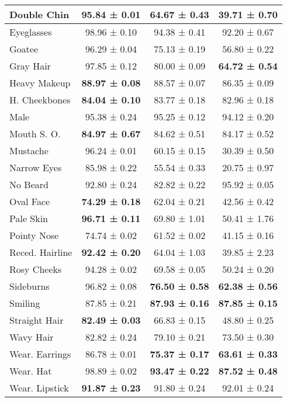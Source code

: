 \begin{table*}[h]
\begin{center}
\begin{small}
{\begin{tabular}{|l|c|c|c|}
Double Chin     & \textbf{95.84 ± 0.01} & 64.67 ± 0.43 & 39.71 ± 0.70 \\ \hline
Eyeglasses      & 98.96 ± 0.10 & 94.38 ± 0.41 & 92.20 ± 0.67 \\ \hline
Goatee          & 96.29 ± 0.04 & 75.13 ± 0.19 & 56.80 ± 0.22 \\ \hline
Gray Hair       & 97.85 ± 0.12 & 80.00 ± 0.09 & \textbf{64.72 ± 0.54} \\ \hline
Heavy Makeup    & \textbf{88.97 ± 0.08} & 88.57 ± 0.07 & 86.35 ± 0.09 \\ \hline
H. Cheekbones   & \textbf{84.04 ± 0.10} & 83.77 ± 0.18 & 82.96 ± 0.18 \\ \hline
Male            & 95.38 ± 0.24 & 95.25 ± 0.12 & 94.12 ± 0.20 \\ \hline
Mouth S. O.     & \textbf{84.97 ± 0.67} & 84.62 ± 0.51 & 84.17 ± 0.52 \\ \hline
Mustache        & 96.24 ± 0.01 & 60.15 ± 0.15 & 30.39 ± 0.50 \\ \hline
Narrow Eyes     & 85.98 ± 0.22 & 55.54 ± 0.33 & 20.75 ± 0.97 \\ \hline
No Beard        & 92.80 ± 0.24 & 82.82 ± 0.22 & 95.92 ± 0.05 \\ \hline
Oval Face       & \textbf{74.29 ± 0.18} & 62.04 ± 0.21 & 42.56 ± 0.42 \\ \hline
Pale Skin       & \textbf{96.71 ± 0.11} & 69.80 ± 1.01 & 50.41 ± 1.76 \\ \hline
Pointy Nose     & 74.74 ± 0.02 & 61.52 ± 0.02 & 41.15 ± 0.16 \\ \hline
Reced. Hairline & \textbf{92.42 ± 0.20} & 64.04 ± 1.03 & 39.85 ± 2.23 \\ \hline
Rosy Cheeks     & 94.28 ± 0.02 & 69.58 ± 0.05 & 50.24 ± 0.20 \\ \hline
Sideburns       & 96.82 ± 0.08 & \textbf{76.50 ± 0.58} & \textbf{62.38 ± 0.56} \\ \hline
Smiling         & 87.85 ± 0.21 & \textbf{87.93 ± 0.16} & \textbf{87.85 ± 0.15} \\ \hline
Straight Hair   & \textbf{82.49 ± 0.03} & 66.83 ± 0.15 & 48.80 ± 0.25 \\ \hline
Wavy Hair       & 82.82 ± 0.24 & 79.10 ± 0.21 & 73.50 ± 0.30 \\ \hline
Wear. Earrings  & 86.78 ± 0.01 & \textbf{75.37 ± 0.17} & \textbf{63.61 ± 0.33} \\ \hline
Wear. Hat       & 98.89 ± 0.02 & \textbf{93.47 ± 0.22} & \textbf{87.52 ± 0.48} \\ \hline
Wear. Lipstick  & \textbf{91.87 ± 0.23} & 91.80 ± 0.24 & 92.01 ± 0.24 \\ \hline

\end{tabular}}
\end{small}
\end{center}
\end{table*}
